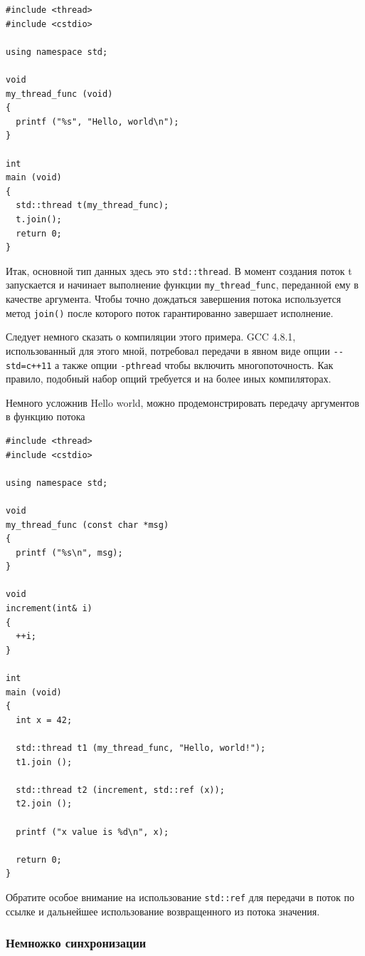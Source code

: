 \documentclass[a4paper,12pt,oneside]{article}
\begin{document}
\begin{lstlisting}
#include <thread>
#include <cstdio>

using namespace std;

void 
my_thread_func (void)
{
  printf ("%s", "Hello, world\n");
}

int 
main (void)
{
  std::thread t(my_thread_func);
  t.join();
  return 0;
}
\end{lstlisting}

Итак, основной тип данных здесь это \lstinline!std::thread!. В момент создания поток t запускается и начинает выполнение функции \lstinline!my_thread_func!, переданной ему в качестве аргумента. Чтобы точно дождаться завершения потока используется метод \lstinline!join()! после которого поток гарантированно завершает исполнение.

Следует немного сказать о компиляции этого примера. GCC 4.8.1, использованный для этого мной, потребовал передачи в явном виде опции \lstinline!--std=c++11! а также опции \lstinline!-pthread! чтобы включить многопоточность. Как правило, подобный набор опций требуется и на более иных компиляторах.

Немного усложнив Hello world, можно продемонстрировать передачу аргументов в функцию потока

\begin{lstlisting}
#include <thread>
#include <cstdio>

using namespace std;

void 
my_thread_func (const char *msg)
{
  printf ("%s\n", msg);
}

void 
increment(int& i)
{
  ++i;
}

int 
main (void)
{
  int x = 42;

  std::thread t1 (my_thread_func, "Hello, world!");
  t1.join ();

  std::thread t2 (increment, std::ref (x));
  t2.join ();

  printf ("x value is %d\n", x);

  return 0;
}
\end{lstlisting}

Обратите особое внимание на использование \lstinline!std::ref! для передачи в поток по ссылке и дальнейшее использование возвращенного из потока значения.

\subsubsection{Немножко синхронизации}
\end{document}
